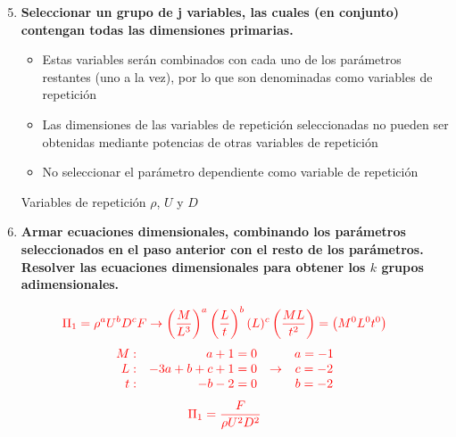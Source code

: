 \documentclass[t]{beamer}
\begin{document}
\begin{frame}
\begin{enumerate}
\setcounter{enumi}{4}
\item \textbf{Seleccionar un grupo de j variables, las cuales (en conjunto) contengan todas las dimensiones primarias.}
\begin{small}
\begin{itemize}
\item Estas variables serán combinados con cada uno de los parámetros restantes (uno a la vez), por lo que son denominadas como variables de repetición
\item Las dimensiones de las variables de repetición seleccionadas no pueden ser obtenidas mediante potencias de otras variables de repetición
\item No seleccionar el parámetro dependiente como variable de repetición
\end{itemize}
{\color{red}Variables de repetición $\rho$, $U$  y $D$}
\end{small}

\end{enumerate}
\end{frame}
\begin{frame}
\begin{enumerate}
\setcounter{enumi}{5}
\item \textbf{Armar ecuaciones dimensionales, combinando los parámetros seleccionados en el paso anterior con el resto de los parámetros. Resolver las ecuaciones dimensionales para obtener los $k$ grupos adimensionales.}
\end{enumerate}
$$\color{red}{\Pi_{1}=\rho^{a} U^{b} D^{c} F \rightarrow\left(\frac{M}{L^{3}}\right)^{a}\left(\frac{L}{t}\right)^{b}(L)^{c}\left(\frac{M L}{t^{2}}\right)=\left(M^{0} L^{0} t^{0}\right)}$$
\color{red}{Igualando los exponentes para cada dimensión:}
$$\color{red}{\begin{array}{rrcc}
M:& a+1=0 & & a=-1 \\
L:& -3a+b+c+1=0 & \rightarrow & c=-2\\
t:& -b-2=0 & & b=-2
\end{array}}
$$     
{\color{red}{Entonces:}}
$$
\color{red}{\Pi_{1}=\frac{F}{\rho U^{2} D^{2}}}
$$
\end{frame}
\end{document}
